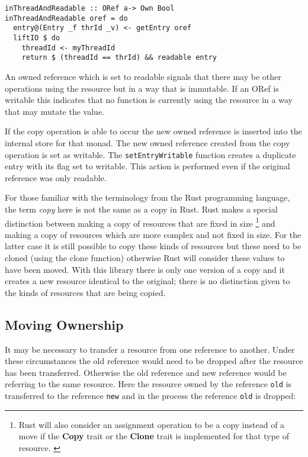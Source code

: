 \documentclass[onehalf,11pt]{beavtex}
\begin{document}
\begin{verbatim}
inThreadAndReadable :: ORef a-> Own Bool
inThreadAndReadable oref = do
  entry@(Entry _f thrId _v) <- getEntry oref
  liftIO $ do
    threadId <- myThreadId
    return $ (threadId == thrId) && readable entry
\end{verbatim}

An owned reference which is set to readable signals that there may be other
operations using the resource but in a way that is immutable.
If an ORef is writable this indicates that no function is currently using the
resource in a way that may mutate the value.

If the copy operation is able to occur the new owned reference is inserted into
the internal store for that monad.  The new owned reference created from the copy
operation is set as writable. The \texttt{setEntryWritable} function
creates a duplicate entry with its flag set to writable.
This action is performed even if the original reference was only
readable.

For those familiar with the terminology from the Rust programming language, the
term \textit{copy} here is not the same as a copy in Rust. Rust makes a special
distinction between making a copy of resources that are fixed in size
\footnote{Rust will also consider an assignment operation to be a copy instead
  of a move if the \textbf{Copy} trait or the \textbf{Clone} trait is
  implemented for that type of resource. \cite{rust_book_traits}
  \cite{rust_docs_clone_trait}}
and making a copy of resources which are more complex and not fixed in size.
For the latter case it is still possible to copy these kinds of resources but these
need to be cloned (using the clone function) otherwise Rust will consider these
values to have been moved. \cite{rust_book_ownership}
With this library there is only one version of a copy and it creates a new
resource identical to the original; there is no distinction given to the kinds
of resources that are being copied.

\subsection{Moving Ownership}

It may be necessary to transfer a resource from one reference to another.
Under these circumstances the old reference would need to be dropped after
the resource has been transferred.
Otherwise the old reference and new reference would be referring to the
same resource. Here the resource owned by the reference \texttt{old} is
transferred to the reference \texttt{new} and in the process the
reference \texttt{old} is dropped:
\end{document}
